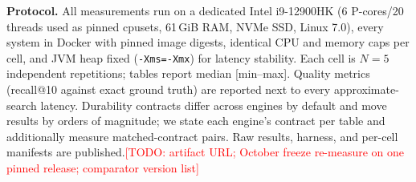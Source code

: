 \documentclass[conference]{IEEEtran}
\newcommand{\todo}[1]{\textcolor{red}{[TODO: #1]}}
\newcommand{\arcadedb}{ArcadeDB}
\begin{document}
\textbf{Protocol.} All measurements run on a dedicated
Intel i9-12900HK (6 P-cores/20 threads used as pinned cpusets, 61\,GiB RAM,
NVMe SSD, Linux 7.0), every system in Docker with pinned image digests,
identical CPU and memory caps per cell, and JVM heap fixed
(\texttt{-Xms=-Xmx}) for latency stability. Each cell is $N{=}5$ independent
repetitions; tables report median [min--max]. Quality metrics (recall@10
against exact ground truth) are reported next to every approximate-search
latency. Durability contracts differ across engines by default and move
results by orders of magnitude; we state each engine's contract per table and
additionally measure matched-contract pairs. Raw results, harness, and
per-cell manifests are published.\todo{artifact URL; October freeze re-measure
on one pinned release; comparator version list}

\begin{table}[t]
\centering
\caption{Tabular workloads, medium scale + TPC-H SF1. Median [min--max],
$N{=}5$. Durability contracts differ: \arcadedb{} groups commits
(async WAL flush, default); PostgreSQL and DuckDB fsync per commit.
Matched-contract pairing in the text.}
\label{tab:tabular}
\scriptsize
\setlength{\tabcolsep}{3pt}

\end{table}

\begin{table}[t]
\centering
\caption{LDBC SNB graph workloads, SF1/SF10. Median [min--max], $N{=}5$.
Bidirectional edge pointers (engine default) for all \arcadedb{} rows.}
\label{tab:graph}
\scriptsize
\setlength{\tabcolsep}{3pt}

\end{table}

\begin{table}[t]
\centering
\caption{Sparse retrieval on Big-ANN (real SPLADE/MS MARCO), exact MIPS
ground truth, 1000 dev queries. Median [min--max], $N{=}5$. int8 rows use the
engine's default posting quantization; fp32 disables it.}
\label{tab:sparse}
\scriptsize
\setlength{\tabcolsep}{3pt}

\end{table}

\begin{table}[t]
\centering
\caption{Dense ANN on DEEP-10M (degree-matched, exact GT) and TSBS cpu-only
time series. Median [min--max], $N{=}5$.}
\label{tab:denses}
\scriptsize
\setlength{\tabcolsep}{3pt}

\end{table}
\end{document}
